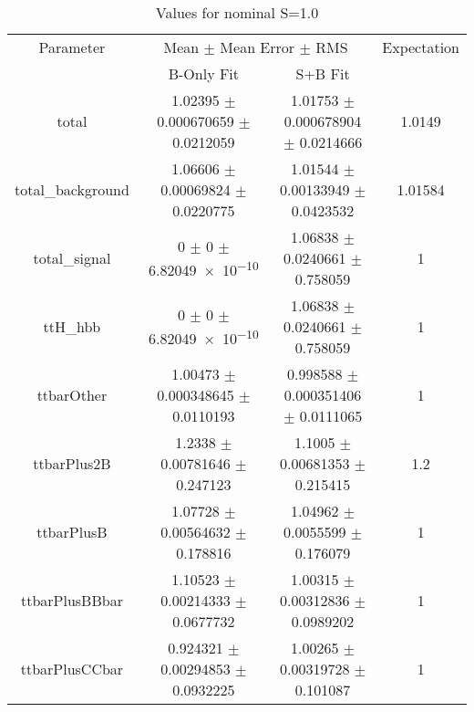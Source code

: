 \begin{table}
\centering
\caption{Values for nominal S=1.0}
\begin{tabular}{cccc}
\toprule
Parameter & \multicolumn{2}{c}{Mean $\pm$ Mean Error $\pm$ RMS} & Expectation\\
 & B-Only Fit & S+B Fit & \\
\midrule
total & \num{1.02395} $\pm$ \num{0.000670659} $\pm$ \num{0.0212059} & \num{1.01753} $\pm$ \num{0.000678904} $\pm$ \num{0.0214666} & \num{1.0149}\\
total\_background & \num{1.06606} $\pm$ \num{0.00069824} $\pm$ \num{0.0220775} & \num{1.01544} $\pm$ \num{0.00133949} $\pm$ \num{0.0423532} & \num{1.01584}\\
total\_signal & \num{0} $\pm$ \num{0} $\pm$ \num{6.82049e-10} & \num{1.06838} $\pm$ \num{0.0240661} $\pm$ \num{0.758059} & \num{1}\\
ttH\_hbb & \num{0} $\pm$ \num{0} $\pm$ \num{6.82049e-10} & \num{1.06838} $\pm$ \num{0.0240661} $\pm$ \num{0.758059} & \num{1}\\
ttbarOther & \num{1.00473} $\pm$ \num{0.000348645} $\pm$ \num{0.0110193} & \num{0.998588} $\pm$ \num{0.000351406} $\pm$ \num{0.0111065} & \num{1}\\
ttbarPlus2B & \num{1.2338} $\pm$ \num{0.00781646} $\pm$ \num{0.247123} & \num{1.1005} $\pm$ \num{0.00681353} $\pm$ \num{0.215415} & \num{1.2}\\
ttbarPlusB & \num{1.07728} $\pm$ \num{0.00564632} $\pm$ \num{0.178816} & \num{1.04962} $\pm$ \num{0.0055599} $\pm$ \num{0.176079} & \num{1}\\
ttbarPlusBBbar & \num{1.10523} $\pm$ \num{0.00214333} $\pm$ \num{0.0677732} & \num{1.00315} $\pm$ \num{0.00312836} $\pm$ \num{0.0989202} & \num{1}\\
ttbarPlusCCbar & \num{0.924321} $\pm$ \num{0.00294853} $\pm$ \num{0.0932225} & \num{1.00265} $\pm$ \num{0.00319728} $\pm$ \num{0.101087} & \num{1}\\
\bottomrule
\end{tabular}
\end{table}